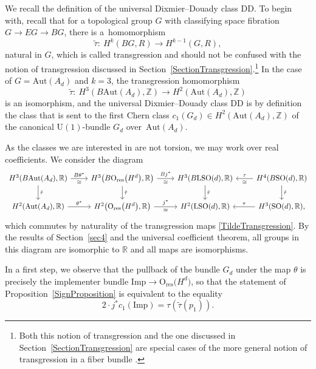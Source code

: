 \documentclass[pdftex]{sigma}
\numberwithin{equation}{section}
\newcommand{\R}{\mathbb{R}}
\newcommand{\Z}{\mathbb{Z}}
\newcommand{\SO}{\mathrm{SO}}
\newcommand{\res}{\mathrm{res}}
\newcommand{\Aut}{\mathrm{Aut}}
\newcommand{\Imp}{\mathrm{Imp}}
\newcommand{\U}{\mathrm{U}}
\renewcommand{\O}{\mathrm{O}}
\renewcommand{\L}{\mathrm{L}}
\newcommand{\DD}{\mathrm{DD}}
\begin{document}
We recall the definition of the universal Dixmier--Douady class $\DD$.
To begin with, recall that for a topological group $G$ with classifying space fibration $G \to EG \to BG$, there is a~homomorphism
\begin{equation*}
 \tilde{\tau} \colon\ H^k(BG, R) \longrightarrow H^{k-1}(G, R),
\end{equation*}
natural in $G$, which is called transgression and should not be confused with the notion of transgression discussed in Section~\ref{SectionTransgression}.\footnote{Both this notion of transgression and the one discussed in Section~\ref{SectionTransgression} are special cases of the more general notion of transgression in a fiber bundle \cite{Borel}.}
In the case of $G = \Aut(A_d)$ and $k=3$, the transgression homomorphism
\begin{equation}
\label{TildeTransgression}
\tilde{\tau} \colon\ H^3(B\Aut(A_d), \Z) \longrightarrow H^2(\Aut(A_d), \Z)	
\end{equation}
is an isomorphism, and the universal Dixmier--Douady class $\DD$ is by definition the class that is sent to the first Chern class $c_1(G_d) \in H^2(\Aut(A_d), \Z)$ of the canonical $\U(1)$-bundle $G_d$ over~$\Aut(A_d)$.




As the classes we are interested in are not torsion, we may work over real coefficients.
We consider the diagram
\begin{equation*}
\begin{tikzcd}[column sep=0.8cm]
H^3(B\Aut(A_d), \R)
	\ar[r, "B\theta^*", "\cong"']
	\ar[d, "\tilde{\tau}"]
&
H^3\big(B\O_{\res}\big(H^d\big), \R\big)
	\ar[r, "Bj^*", "\cong"']
	\ar[d, "\tilde{\tau}"]
&
H^3(B\L\SO(d), \R)
	\ar[d, "\tilde{\tau}"]
&
H^4(B\SO(d), \R)
\ar[l, "\tau"', "\cong"]
	\ar[d, "\tilde{\tau}"]
\\
H^2(\Aut(A_d), \R)
	\ar[r, "\theta^*"]
&
H^2\big(\O_{\res}\big(H^d\big), \R\big)
	\ar[r, "j^*", "\cong"']
&
H^2(\L \SO(d), \R)
&
H^3(\SO(d), \R),
\ar[l, "\tau"']
\end{tikzcd}
\end{equation*}
which commutes by naturality of the transgression maps \eqref{TildeTransgression}.
By the results of Section~\ref{sec4} and the universal coefficient theorem, all groups in this diagram are isomorphic to $\R$ and all maps are isomorphisms.

In a first step, we observe that the pullback of the bundle $G_d$ under the map $\theta$ is precisely the implementer bundle $\Imp \to \O_{\mathrm{res}}\big(H^d\big)$, so that the statement of Proposition~\ref{SignProposition} is equivalent to the equality
\begin{equation*}
	2\cdot j^*c_1(\Imp) = \tau (\tilde{\tau}(p_1)).
\end{equation*}
\end{document}
